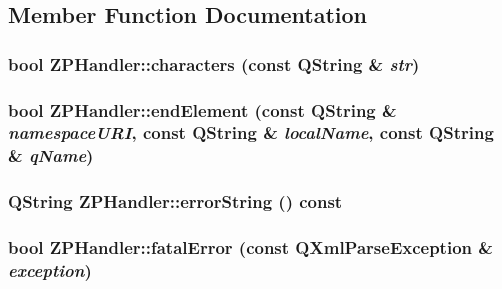 \subsection{Member Function Documentation}
\hypertarget{class_robot_model_1_1_z_p_handler_a246f066600bede52d4321d0ccebd5cec}{
\subsubsection[{characters}]{\setlength{\rightskip}{0pt plus 5cm}bool ZPHandler::characters (const QString \& {\em str})}}
\label{class_robot_model_1_1_z_p_handler_a246f066600bede52d4321d0ccebd5cec}
\hypertarget{class_robot_model_1_1_z_p_handler_ab058af372b5178f8877907ee45b8257d}{
\subsubsection[{endElement}]{\setlength{\rightskip}{0pt plus 5cm}bool ZPHandler::endElement (const QString \& {\em namespaceURI}, \/  const QString \& {\em localName}, \/  const QString \& {\em qName})}}
\label{class_robot_model_1_1_z_p_handler_ab058af372b5178f8877907ee45b8257d}
\hypertarget{class_robot_model_1_1_z_p_handler_aca3c34530b327d635a4e915992f576de}{
\subsubsection[{errorString}]{\setlength{\rightskip}{0pt plus 5cm}QString ZPHandler::errorString () const}}
\label{class_robot_model_1_1_z_p_handler_aca3c34530b327d635a4e915992f576de}
\hypertarget{class_robot_model_1_1_z_p_handler_a442f6837417a1baa0d60641ddd854109}{
\subsubsection[{fatalError}]{\setlength{\rightskip}{0pt plus 5cm}bool ZPHandler::fatalError (const QXmlParseException \& {\em exception})}}
